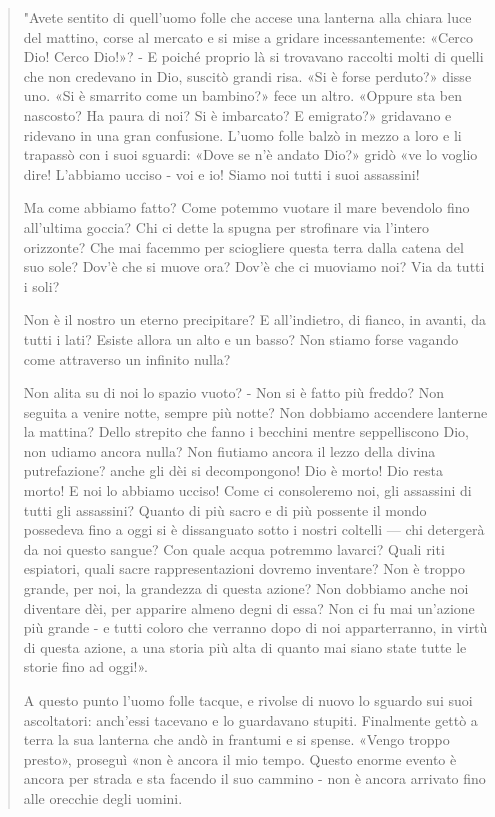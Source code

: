 \documentclass[a4paper, twoside, titlepage]{book}
\newcommand{\citazione}[1]{%
  \begin{quotation}
  #1
  \end{quotation}}
\begin{document}
\citazione{ "Avete sentito di quell’uomo folle che accese una lanterna alla chiara luce del mattino, corse al mercato e si mise a gridare incessantemente: «Cerco Dio! Cerco Dio!»? - E poiché proprio là si trovavano raccolti molti di quelli che non credevano in Dio, suscitò grandi risa. «Si è forse perduto?» disse uno. «Si è smarrito come un bambino?» fece un altro. «Oppure sta ben nascosto? Ha paura di noi? Si è imbarcato? E emigrato?» gridavano e ridevano in una gran confusione. L’uomo folle balzò in mezzo a loro e li trapassò con i suoi sguardi: «Dove se n’è andato Dio?» gridò «ve lo voglio dire! L’abbiamo ucciso - voi e io! Siamo noi tutti i suoi assassini!

Ma come abbiamo fatto? Come potemmo vuotare il mare bevendolo fino all’ultima goccia? Chi ci dette la spugna per strofinare via l’intero orizzonte? Che mai facemmo per sciogliere questa terra dalla catena del suo sole? Dov’è che si muove ora? Dov’è che ci muoviamo noi? Via da tutti i soli?

Non è il nostro un eterno precipitare? E all’indietro, di fianco, in avanti, da tutti i lati? Esiste allora un alto e un basso? Non stiamo forse vagando come attraverso un infinito nulla?

Non alita su di noi lo spazio vuoto? - Non si è fatto più freddo? Non seguita a venire notte, sempre più notte? Non dobbiamo accendere lanterne la mattina? Dello strepito che fanno i becchini mentre seppelliscono Dio, non udiamo ancora nulla? Non fiutiamo ancora il lezzo della divina putrefazione? anche gli dèi si decompongono! Dio è morto! Dio resta morto! E noi lo abbiamo ucciso! Come ci consoleremo noi, gli assassini di tutti gli assassini? Quanto di più sacro e di più possente il mondo possedeva fino a oggi si è dissanguato sotto i nostri coltelli — chi detergerà da noi questo sangue? Con quale acqua potremmo lavarci? Quali riti espiatori, quali sacre rappresentazioni dovremo inventare? Non è troppo grande, per noi, la grandezza di questa azione? Non dobbiamo anche noi diventare dèi, per apparire almeno degni di essa? Non ci fu mai un’azione più grande - e tutti coloro che verranno dopo di noi apparterranno, in virtù di questa azione, a una storia più alta di quanto mai siano state tutte le storie fino ad oggi!».

A questo punto l’uomo folle tacque, e rivolse di nuovo lo sguardo sui suoi ascoltatori: anch’essi tacevano e lo guardavano stupiti. Finalmente gettò a terra la sua lanterna che andò in frantumi e si spense. «Vengo troppo presto», proseguì «non è ancora il mio tempo. Questo enorme evento è ancora per strada e sta facendo il suo cammino - non è ancora arrivato fino alle orecchie degli uomini.

}
\end{document}
